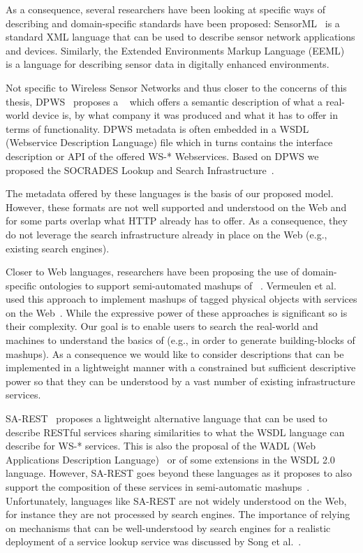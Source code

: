 As a consequence, several researchers have been looking at specific ways of describing \sts{} and domain-specific standards have been proposed: SensorML~\cite{Botts2007} is a standard XML language that can be used to describe sensor network applications and devices. Similarly, the Extended Environments Markup Language (EEML)~ is a language for describing sensor data in digitally enhanced environments.

Not specific to Wireless Sensor Networks and thus closer to the concerns of this thesis, DPWS~\cite{Jammes2005-DPWS} proposes a ~ which offers a semantic description of what a real-world device is, by what company it was produced and what it has to offer in terms of functionality. DPWS metadata is often embedded in a WSDL (Webservice Description Language) file which in turns contains the interface description or API of the offered WS-* Webservices. Based on DPWS we proposed the SOCRADES Lookup and Search Infrastructure~\cite{Guinard2009b}.

The metadata offered by these languages is the basis of our proposed \stm{} model. However, these formats are not well supported and understood on the Web and for some parts overlap what HTTP already has to offer. As a consequence, they do not leverage the search infrastructure already in place on the Web (e.g., existing search engines). 

Closer to Web languages, researchers have been proposing the use of domain-specific ontologies to support semi-automated mashups of \sts{}~\cite{Vermeulen2007a,Katasonov2010}. Vermeulen et al. used this approach to implement mashups of tagged physical objects with services on the Web~\cite{Vermeulen2007}. While the expressive power of these approaches is significant so is their complexity. Our goal is to enable users to search the real-world and machines to understand the basics of \sts{} (e.g., in order to generate building-blocks of mashups). As a consequence we would like to consider descriptions that can be implemented in a lightweight manner with a constrained but sufficient descriptive power so that they can be understood by a vast number of existing infrastructure services. 

SA-REST~\cite{Lathem2007} proposes a lightweight alternative language that can be used to describe RESTful services sharing similarities to what the WSDL language can describe for WS-* services. This is also the proposal of the WADL (Web Applications Description Language)~\cite{Hadley2006} or of some extensions in the WSDL 2.0 language. However, SA-REST goes beyond these languages as it proposes to also support the composition of these services in semi-automatic mashups~\cite{Sheth2007}. Unfortunately, languages like SA-REST are not widely understood on the Web, for instance they are not processed by search engines. The importance of relying on mechanisms that can be well-understood by search engines for a realistic deployment of a service lookup service was discussed by Song et al.~\cite{Song2007}. 

